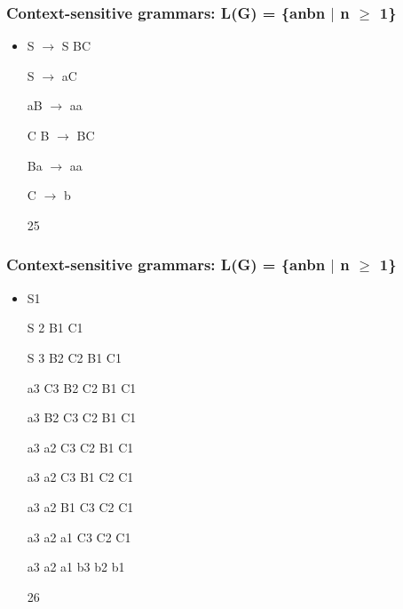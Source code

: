 \documentclass[compress,color=usenames]{beamer}
\begin{document}
\begin{frame}
\frametitle{Context-sensitive grammars: L(G) = \{anbn $\mid$ n $\geq$ 1\}}

\begin{itemize}
\item




S $\rightarrow$ S BC


S $\rightarrow$ aC


aB $\rightarrow$ aa


C B $\rightarrow$ BC


Ba $\rightarrow$ aa


C $\rightarrow$ b





25




\end{itemize}

\end{frame}

\begin{frame}
\frametitle{Context-sensitive grammars: L(G) = \{anbn $\mid$ n $\geq$ 1\}}

\begin{itemize}
\item




S1


S 2 B1 C1


S 3 B2 C2 B1 C1


a3 C3 B2 C2 B1 C1


a3 B2 C3 C2 B1 C1


a3 a2 C3 C2 B1 C1


a3 a2 C3 B1 C2 C1


a3 a2 B1 C3 C2 C1


a3 a2 a1 C3 C2 C1


a3 a2 a1 b3 b2 b1





26




\end{itemize}

\end{frame}
\end{document}
